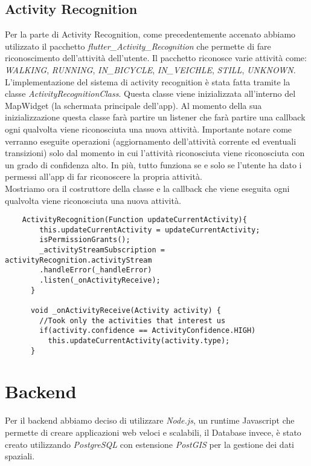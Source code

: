 \documentclass[../../Report.tex]{subfiles}
\begin{document}
\subsection{Activity Recognition}
Per la parte di Activity Recognition, come precedentemente accenato abbiamo utilizzato il pacchetto \emph{flutter\_Activity\_Recognition} che permette di fare riconoscimento dell'attività dell'utente. Il pacchetto riconosce varie attività come: \emph{WALKING}, \emph{RUNNING}, \emph{IN\_BICYCLE}, \emph{IN\_VEICHLE}, \emph{STILL}, \emph{UNKNOWN}. L'implementazione del sistema di activity recognition è stata fatta tramite la classe \emph{ActivityRecognitionClass}. Questa classe viene inizializzata all'interno del MapWidget (la schermata principale dell'app). Al momento della sua inizializzazione questa classe farà partire un listener che farà partire una callback ogni qualvolta viene riconosciuta una nuova attività. Importante notare come verranno eseguite operazioni (aggiornamento dell'attività corrente ed eventuali transizioni) solo dal momento in cui l'attività riconosciuta viene riconosciuta con un grado di confidenza alto. In più, tutto funziona se e solo se l'utente ha dato i permessi all'app di far riconoscere la propria attività.\\
Mostriamo ora il costruttore della classe e la callback che viene eseguita ogni qualvolta viene riconosciuta una nuova attività.\\
\begin{lstlisting}
    ActivityRecognition(Function updateCurrentActivity){
        this.updateCurrentActivity = updateCurrentActivity;
        isPermissionGrants();
        _activityStreamSubscription = activityRecognition.activityStream
        .handleError(_handleError)
        .listen(_onActivityReceive);
      }
    
      void _onActivityReceive(Activity activity) {
        //Took only the activities that interest us
        if(activity.confidence == ActivityConfidence.HIGH) 
          this.updateCurrentActivity(activity.type);
      }
\end{lstlisting}

\section{Backend}
    Per il backend abbiamo deciso di utilizzare \emph{Node.js}, un runtime Javascript che permette di creare applicazioni web veloci e scalabili, il Database invece, è stato creato utilizzando \emph{PostgreSQL} con estensione \emph{PostGIS} per la gestione dei dati spaziali.\\
\end{document}
